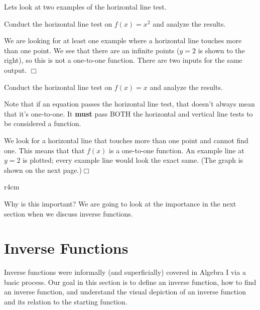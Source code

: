 \documentclass[../book.tex]{subfiles}
\begin{document}
Lets look at two examples of the horizontal line test.
\begin{example}
Conduct the horizontal line test on $f(x)=x^2$ and analyze the results.
\end{example}
\begin{solution}
We are looking for at least one example where a horizontal line touches more than one point.  We see that there are an infinite points ($y=2$ is shown to the right), so this is not a one-to-one function.  There are two inputs for the same output.  $\Box$
\end{solution}
\begin{example}
Conduct the horizontal line test on $f(x)=x$ and analyze the results.
\end{example}
\begin{remark}
  Note that if an equation passes the horizontal line test, that doesn't always mean that it's one-to-one.  It \textbf{must} pass BOTH the horizontal and vertical line tests to be considered a function.
\end{remark}
\begin{solution}
We look for a horizontal line that touches more than one point and cannot find one.  This means that that $f(x)$ is a one-to-one function.  An example line at $y=2$ is plotted; every example line would look the exact same.  (The graph is shown on the next page.)$\Box$
\end{solution}
\newpage
\begin{wrapfigure}{r}{4cm}
\end{wrapfigure}
Why is this important?  We are going to look at the importance in the next section when we discuss inverse functions.
\section{Inverse Functions}
\noindent Inverse functions were informally (and superficially) covered in Algebra I via a basic process.  Our goal in this section is to define an inverse function, how to find an inverse function, and understand the visual depiction of an inverse function and its relation to the starting function.
\end{document}
